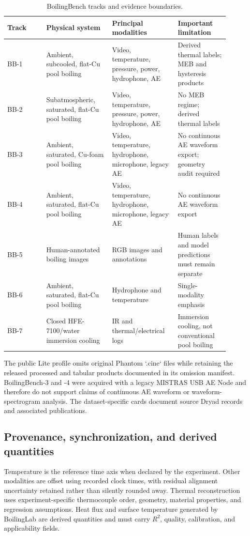 \documentclass[11pt]{article}
\begin{document}
\begin{table}[t]
\centering\small
\caption{BoilingBench tracks and evidence boundaries.}
\label{tab:tracks}
\begin{tabular}{p{0.16\linewidth}p{0.27\linewidth}p{0.27\linewidth}p{0.21\linewidth}}
\toprule
Track & Physical system & Principal modalities & Important limitation\\
\midrule
BB-1 & Ambient, subcooled, flat-Cu pool boiling & Video, temperature, pressure, power, hydrophone, AE & Derived thermal labels; MEB and hysteresis products\\
BB-2 & Subatmospheric, saturated, flat-Cu pool boiling & Video, temperature, pressure, power, hydrophone, AE & No MEB regime; derived thermal labels\\
BB-3 & Ambient, saturated, Cu-foam pool boiling & Video, temperature, hydrophone, microphone, legacy AE & No continuous AE waveform export; geometry audit required\\
BB-4 & Ambient, saturated, flat-Cu pool boiling & Video, temperature, hydrophone, microphone, legacy AE & No continuous AE waveform export\\
BB-5 & Human-annotated boiling images & RGB images and annotations & Human labels and model predictions must remain separate\\
BB-6 & Ambient, saturated, flat-Cu pool boiling & Hydrophone and temperature & Single-modality emphasis\\
BB-7 & Closed HFE-7100/water immersion cooling & IR and thermal/electrical logs & Immersion cooling, not conventional pool boiling\\
\bottomrule
\end{tabular}
\end{table}

The public Lite profile omits original Phantom `.cine` files while retaining the released processed and tabular products documented in its omission manifest. BoilingBench-3 and -4 were acquired with a legacy MISTRAS USB AE Node and therefore do not support claims of continuous AE waveform or waveform-spectrogram analysis. The dataset-specific cards document source Dryad records and associated publications.

\subsection{Provenance, synchronization, and derived quantities}

Temperature is the reference time axis when declared by the experiment. Other modalities are offset using recorded clock times, with residual alignment uncertainty retained rather than silently rounded away. Thermal reconstruction uses experiment-specific thermocouple order, geometry, material properties, and regression assumptions. Heat flux and surface temperature generated by BoilingLab are derived quantities and must carry $R^2$, quality, calibration, and applicability fields.
\end{document}
